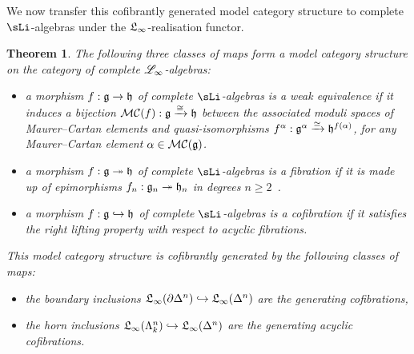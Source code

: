 \documentclass[twoside, 10pt]{amsart}
\newtheorem{theorem}[lemma]{Theorem}
\begin{document}
We now transfer this cofibrantly generated model category structure to complete $\sLi$-algebras under the $\Li$-realisation functor.

\begin{theorem}
 The following three classes of maps form a model category structure on the category of complete $\L_\infty$-algebras:
\begin{itemize}
\item a morphism $f  :  \g \to \h$ of complete $\sLi$-algebras is a weak equivalence if 
it induces a bijection $\mathcal{MC}(f): \mathcal{\g}\xrightarrow{\cong}\h$ between the associated moduli spaces of Maurer--Cartan elements and quasi-isomorphisms $f^\alpha : \g^\alpha \xrightarrow{\simeq} \h^{f(\alpha)}$, for any Maurer--Cartan element $\alpha \in \mathcal{MC}(\g)$. 

\item a morphism $f  :  \g\twoheadrightarrow \h$ of complete $\sLi$-algebras is a fibration  if it is made up of epimorphisms $f_n  :  \g_n \twoheadrightarrow \h_n$ in degrees $n\geqslant 2$\ . 

\item a morphism $f  :  \g \hookrightarrow \h$ of complete $\sLi$-algebras is a cofibration if 
it satisfies the right lifting property with respect to acyclic fibrations. 

\end{itemize}
This model category structure is cofibrantly generated by the following classes of maps:
\begin{itemize}
\item the boundary inclusions $\Li(\partial \De{n}) \hookrightarrow \Li(\De{n})$ are the generating cofibrations, 

\item the horn inclusions $\Li(\Ho{k}{n})  \hookrightarrow \Li(\De{n})$ are the generating acyclic cofibrations. 
\end{itemize}
\end{theorem}
\end{document}
